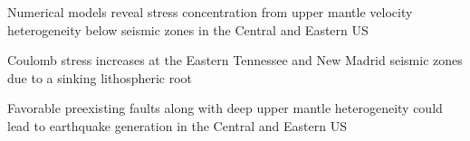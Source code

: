 \documentclass[draft,linenumbers]{agujournal2018}
\begin{document}



\begin{keypoints}
\item Numerical models reveal stress concentration from upper mantle velocity heterogeneity below seismic zones in the Central and Eastern US
\item Coulomb stress increases at the Eastern Tennessee and New Madrid seismic zones due to a sinking lithospheric root
\item Favorable preexisting faults along with deep upper mantle  heterogeneity could lead to earthquake generation in the Central and Eastern US
\end{keypoints}

%
%

\end{document}

